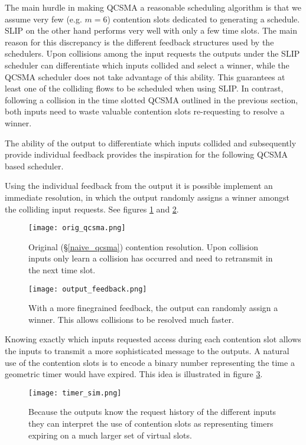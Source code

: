 \documentclass{IEEEtran}%
\begin{document}
The main hurdle in making QCSMA a reasonable scheduling algorithm is that we assume very few (e.g. $m=6$) contention slots dedicated to generating a schedule.  SLIP on the other hand performs very well with only a few time slots.  The main reason for this discrepancy is the different feedback structures used by the schedulers. Upon collisions among the input requests the outputs under the SLIP scheduler can differentiate which inputs collided and select a winner, while the QCSMA scheduler does not take advantage of this ability.  This guarantees at least one of the colliding flows to be scheduled when using SLIP.  In contrast, following a collision in the time slotted QCSMA outlined in the previous section, both inputs need to waste valuable contention slots re-requesting to resolve a winner.

	The ability of the output to differentiate which inputs collided and subsequently provide individual feedback provides the inspiration for the following QCSMA based scheduler.
	
	Using the individual feedback from the output it is possible implement an immediate resolution, in which the output randomly assigns a winner amongst the colliding input requests.  See figures \ref{orig_qcsma} and \ref{output_feedback}.  
	
\begin{figure}%
\texttt{[image: orig\_qcsma.png]}
\caption{Original (\S\ref{naive_qcsma}) contention resolution.  Upon collision inputs only learn a collision has occurred and need to retransmit in the next time slot.} 	\label{orig_qcsma}
\end{figure}
\begin{figure}%
	 \texttt{[image: output\_feedback.png]}
	\caption{With a more finegrained feedback, the output can randomly assign a winner.  This allows collisions to be resolved much faster.} 	\label{output_feedback}
\end{figure}
	
	Knowing exactly which inputs requested access during each contention slot allows the inputs to transmit a more sophisticated message to the outputs.  A natural use of the contention slots is to encode a binary number representing the time a geometric timer would have expired.  This idea is illustrated in figure \ref{timer_sim}.
	
\begin{figure}%
	 \texttt{[image: timer\_sim.png]}
	\caption{Because the outputs know the request history of the different inputs they can interpret the use of contention slots as representing timers expiring on a much larger set of virtual slots.} 	\label{timer_sim}
\end{figure}
\end{document}
